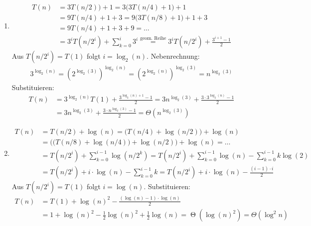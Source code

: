 \documentclass[11pt,a4paper]{article}
\begin{document}
\begin{loesung}
\begin{enumerate}
\begin{enumerate}[label=\roman*)]
        \item
        \begin{align*}
            T(n) &= 3T(n / 2)) + 1 = 3\big(3T(n / 4) + 1\big) + 1 \\
            &= 9T(n / 4) + 1 + 3 = 9\big(3T(n / 8) + 1\big) + 1 + 3 \\
            &= 9T(n / 4) + 1 + 3 + 9 = \ldots \\
            &= 3^i T(n / 2^i) + \sum\limits_{k = 0}^{i} 3^i \overset{\text{geom. Reihe}}{=} 
            3^i T(n / 2^i) + \frac{3^{i + 1} - 1}{2}
        \end{align*}
        Aus $T(n / 2^i) = T(1)$ folgt $i = \log_2(n)$. Nebenrechnung:
        \begin{align*}
            3^{\log_2(n)} = \left(2^{\log_2(3)}\right)^{\log_2(n)} = 
            \left(2^{\log_2(n)}\right)^{\log_2(3)} = n ^{\log_2(3)}
        \end{align*}
        Substituieren:
        \begin{align*}
            T(n) &= 3^{\log_2(n)}T(1) + \frac{3^{\log_2(n) + 1} - 1}{2}
            = 3n^{\log_2(3)} + \frac{3 \cdot 3^{\log_2(n)} - 1}{2} \\
            &= 3n^{\log_2(3)} + \frac{3 \cdot n^{\log_2(3)} - 1}{2}
            = \Theta(n^{\log_2(3)})
        \end{align*}

        \item
        \begin{align*}
            T(n) &= T(n/2) + \log(n) = \big(T(n / 4) + \log(n / 2)\big) + \log(n) \\
            &= \Big(\big(T(n / 8) + \log(n / 4)\big) + \log(n / 2)\Big) + \log(n) = \ldots \\
            &= T(n / 2^i) + \sum\limits_{k = 0}^{i - 1} \log(n / 2^k)
            = T(n / 2^i) + \sum\limits_{k = 0}^{i - 1} \log(n) - \sum\limits_{k = 0}^{i - 1} k\log(2) \\
            &= T(n / 2^i) + i \cdot \log(n) - \sum\limits_{k=0}^{i - 1} k
            = T(n / 2^i) + i \cdot \log(n) - \frac{(i - 1) \cdot i}{2}
        \end{align*}
        Aus $T(n / 2^i) = T(1)$ folgt $i = \log(n)$. Substituieren:
        \begin{align*}
            T(n) &= T(1) + \log(n)^2 - \frac{(\log(n) - 1) \cdot \log(n)}{2} \\
            &= 1 + \log(n)^2 - \frac{1}{2} \log(n)^2 + \frac{1}{2} \log(n) = \operatorname{\Theta}\left(\log(n)^2\right) = \Theta(\log^2 n)
        \end{align*}


\end{enumerate}
\end{enumerate}
\end{loesung}
\end{document}
